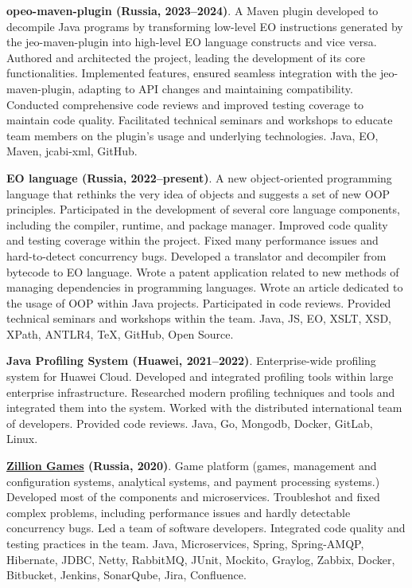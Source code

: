 \documentclass{vl}
\begin{document}
\textbf{opeo-maven-plugin (Russia, 2023--2024)}.
A Maven plugin developed to decompile Java programs by transforming low-level EO instructions
generated by the jeo-maven-plugin into high-level EO language constructs and vice versa.
Authored and architected the project, leading the development of its core functionalities.
Implemented features, ensured seamless integration with the jeo-maven-plugin, adapting to API changes and
maintaining compatibility.
Conducted comprehensive code reviews and improved testing coverage to maintain code quality.
Facilitated technical seminars and workshops to educate team members on the plugin's usage and underlying
technologies.
Java, EO, Maven, jcabi-xml, GitHub.

\textbf{EO language (Russia, 2022--present)}.
A new object-oriented programming language
that rethinks the very idea of objects and suggests a set of new OOP principles.
Participated in the development of several core language components,
including the compiler, runtime, and package manager.
Improved code quality and testing coverage within the project.
Fixed many performance issues and hard-to-detect concurrency bugs.
Developed a translator and decompiler from bytecode to EO language.
Wrote a patent application related to new methods of managing dependencies in programming languages.
Wrote an article dedicated to the usage of OOP within Java projects.
Participated in code reviews.
Provided technical seminars and workshops within the team.
Java, JS, EO, XSLT, XSD, XPath, ANTLR4, TeX, GitHub, Open Source.

\textbf{Java Profiling System (Huawei, 2021--2022)}.
Enterprise-wide profiling system for Huawei Cloud.
Developed and integrated profiling tools within large enterprise infrastructure.
Researched modern profiling techniques and tools and integrated them into the system.
Worked with the distributed international team of developers.
Provided code reviews.
Java, Go, Mongodb, Docker, GitLab, Linux.

\textbf{\href{http://zillion.games/}{Zillion Games} (Russia, 2020)}.
Game platform (games, management and configuration systems, analytical systems, and payment processing systems.)
Developed most of the components and microservices.
Troubleshot and fixed complex problems, including performance issues and hardly detectable concurrency bugs.
Led a team of software developers.
Integrated code quality and testing practices in the team.
Java, Microservices, Spring, Spring-AMQP, Hibernate, JDBC, Netty, RabbitMQ, JUnit, Mockito, Graylog, Zabbix, Docker,
Bitbucket, Jenkins, SonarQube, Jira, Confluence.
\end{document}
